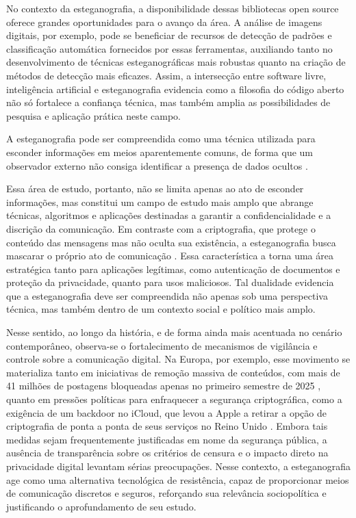\documentclass[12pt]{article}
\begin{document}
No contexto da esteganografia, a disponibilidade dessas bibliotecas open source
oferece grandes oportunidades para o avanço da área. A análise de imagens digitais,
por exemplo, pode se beneficiar de recursos de detecção de padrões e
classificação automática fornecidos por essas ferramentas, auxiliando tanto no
desenvolvimento de técnicas esteganográficas mais robustas quanto na criação de
métodos de detecção mais eficazes. Assim, a intersecção entre software livre,
inteligência artificial e esteganografia evidencia como a filosofia do código
aberto não só fortalece a confiança técnica, mas também amplia as
possibilidades de pesquisa e aplicação prática neste campo.

A esteganografia pode ser compreendida como uma técnica utilizada para esconder
informações em meios aparentemente comuns, de forma que um observador externo
não consiga identificar a presença de dados ocultos \cite{Fridrich2010}.

Essa área de estudo, portanto, não se limita apenas ao ato de esconder
informações, mas constitui um campo de estudo mais amplo que abrange técnicas,
algoritmos e aplicações destinadas a garantir a confidencialidade e a discrição
da comunicação. Em contraste com a criptografia, que protege o conteúdo das
mensagens mas não oculta sua existência, a esteganografia busca mascarar o
próprio ato de comunicação \cite{Fridrich2010}. Essa característica a torna uma
área estratégica tanto para aplicações legítimas, como autenticação de
documentos e proteção da privacidade, quanto para usos maliciosos. Tal
dualidade evidencia que a esteganografia deve ser compreendida não apenas sob
uma perspectiva técnica, mas também dentro de um contexto social e político
mais amplo.

Nesse sentido, ao longo da história, e de forma ainda mais acentuada no cenário
contemporâneo, observa-se o fortalecimento de mecanismos de vigilância e
controle sobre a comunicação digital. Na Europa, por exemplo, esse movimento se
materializa tanto em iniciativas de remoção massiva de conteúdos, com mais de
41 milhões de postagens bloqueadas apenas no primeiro semestre de 2025
\cite{poder3602025}, quanto em pressões políticas para enfraquecer a segurança
criptográfica, como a exigência de um backdoor no iCloud, que levou a Apple a
retirar a opção de criptografia de ponta a ponta de seus serviços no Reino
Unido \cite{guardian2025}. Embora tais medidas sejam frequentemente
justificadas em nome da segurança pública, a ausência de transparência sobre os
critérios de censura e o impacto direto na privacidade digital levantam sérias
preocupações. Nesse contexto, a esteganografia age como uma alternativa
tecnológica de resistência, capaz de proporcionar meios de comunicação
discretos e seguros, reforçando sua relevância sociopolítica e justificando o
aprofundamento de seu estudo.
\end{document}
